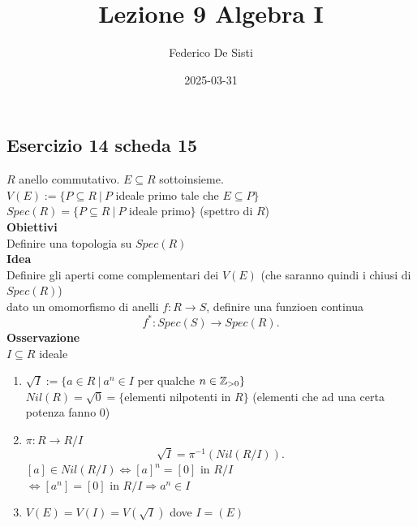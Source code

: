 \documentclass[12px]{article}
\title{Lezione 9 Algebra I}
\date{2025-03-31}
\author{Federico De Sisti}
\begin{document}
	\maketitle
	\newpage
	\subsection{Esercizio 14 scheda 15}
$R$ anello commutativo. $E\subseteq R$ sottoinsieme.\\
$V(E) := \{P\subseteq R \ | \ P$ ideale primo tale che $E\subseteq P\}$\\
$Spec(R) = \{P\subseteq R \ |\ P$ ideale primo$\}$ (spettro di  $R$)\\
\textbf{Obiettivi}\\
Definire una topologia su $Spec(R)$\\
 \textbf{Idea}\\
 Definire gli aperti come complementari dei $V(E)$ (che saranno quindi i chiusi di $Spec(R)$)\\
 dato un omomorfismo di anelli $f: R \rightarrow S$, definire una funzioen continua
 \[
 f^*:Spec(S) \rightarrow Spec(R)
 .\] 
 \textbf{Osservazione}\\
 $I\subseteq R$ ideale
 \begin{enumerate}
	 \item $\sqrt{I}:=\{a\in R \ | \ a^n\in I$ per qualche $n\in\mathbb{Z}_{>0}\}$ \\
	 $Nil(R) = \sqrt{0} = \{$elementi nilpotenti in $R\}$ (elementi che ad una certa potenza fanno 0)
 \item $\pi : R \rightarrow R/I$
	 \[
		 \sqrt{I} = \pi^{-1}(Nil(R/I))
	 .\] 
 $[a]\in Nil(R/I) \Leftrightarrow [a]^n = [0]$ in $R/I$\\
 $ \Leftrightarrow [a^n]=[0]$ in $R/I \Rightarrow  a^n\in I$
\item $V(E) = V(I) = V(\sqrt{I})$ dove $I = (E)$
 \end{enumerate}
\end{document}
